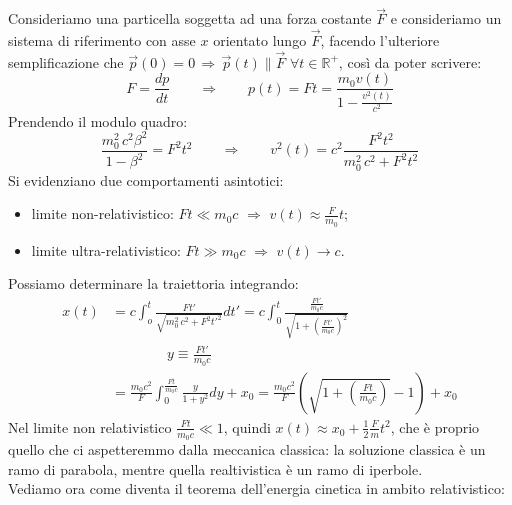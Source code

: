 \documentclass[]{article}
\begin{document}
Consideriamo una particella soggetta ad una forza costante $ \vec{F} $ e consideriamo un sistema di riferimento con asse $ x $ orientato lungo $ \vec{F} $, facendo l'ulteriore semplificazione che $ \vec{p}(0) = 0 \,\Rightarrow\, \vec{p}(t) \parallel \vec{F} \,\,\forall t\in\mathbb{R}^+$, così da poter scrivere:
\begin{equation}
	F = \displaystyle\frac{dp}{dt} \qquad \Longrightarrow \qquad p(t) = F t = \displaystyle\frac{m_0 v(t)}{1 - \frac{v^2(t)}{c^2}}
	\label{eq:18}
\end{equation}
Prendendo il modulo quadro:
\begin{equation}
	\displaystyle\frac{m_0^2 \, c^2 \beta^2}{1 - \beta^2} = F^2 t^2 \qquad \Longrightarrow \qquad v^2(t) = c^2 \displaystyle\frac{F^2 t^2}{m_0^2 \, c^2 + F^2 t^2}
	\label{eq:19}
\end{equation}
Si evidenziano due comportamenti asintotici:
\begin{itemize}
	\item limite non-relativistico: $ Ft \ll m_0 c \,\,\Rightarrow\,\, v(t) \approx \frac{F}{m_0}t$;
	\item limite ultra-relativistico: $ Ft \gg m_0 c \,\,\Rightarrow\,\, v(t) \rightarrow c $.
\end{itemize}
Possiamo determinare la traiettoria integrando:
\begin{equation}
	\begin{split}
		x(t) &= c \int_o^t \displaystyle\frac{Ft'}{\sqrt{{m_0^2 \, c^2 + F^2 t'^2}}} dt' = c \int_0^t \displaystyle\frac{\frac{Ft'}{m_0 c}}{\sqrt{1 + (\frac{F t'}{m_0 c})^2}} \\ 
		     & \qquad\qquad y \equiv \frac{F t'}{m_0 c} \\ 
		     &= \frac{m_0 c^2}{F} \int_0^{\frac{Ft}{m_0 c}} \displaystyle\frac{y}{1 + y^2} dy + x_0 = \displaystyle\frac{m_0 c^2}{F} \left(\sqrt{1 + \left(\frac{F t}{m_0 c}\right)} - 1\right) + x_0
	\end{split}
	\label{eq:20}
\end{equation}
Nel limite non relativistico $ \frac{Ft}{m_0c} \ll 1 $, quindi $ x(t) \approx x_0 + \frac{1}{2}\frac{F}{m}t^2 $, che è proprio quello che ci aspetteremmo dalla meccanica classica: la soluzione classica è un ramo di parabola, mentre quella realtivistica è un ramo di iperbole. \\ 
%
Vediamo ora come diventa il teorema dell'energia cinetica in ambito relativistico:
\end{document}
